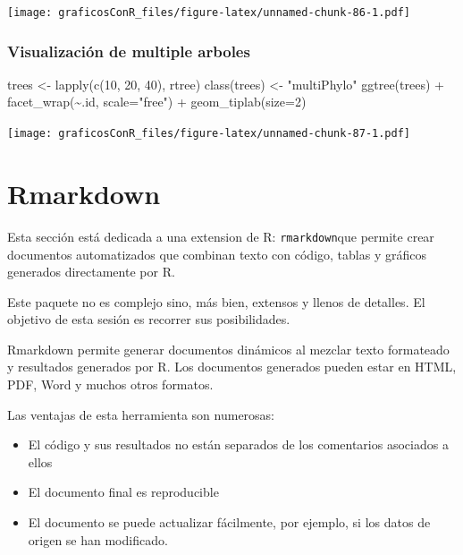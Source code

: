 \documentclass[
]{article}
\newenvironment{Shaded}{\begin{snugshade}}{\end{snugshade}}
\newcommand{\AttributeTok}[1]{\textcolor[rgb]{0.77,0.63,0.00}{#1}}
\newcommand{\DecValTok}[1]{\textcolor[rgb]{0.00,0.00,0.81}{#1}}
\newcommand{\FunctionTok}[1]{\textcolor[rgb]{0.00,0.00,0.00}{#1}}
\newcommand{\NormalTok}[1]{#1}
\newcommand{\OtherTok}[1]{\textcolor[rgb]{0.56,0.35,0.01}{#1}}
\newcommand{\SpecialCharTok}[1]{\textcolor[rgb]{0.00,0.00,0.00}{#1}}
\newcommand{\StringTok}[1]{\textcolor[rgb]{0.31,0.60,0.02}{#1}}
\providecommand{\tightlist}{%
  \setlength{\itemsep}{0pt}\setlength{\parskip}{0pt}}
\numberwithin{ejcnt}{section}
\begin{document}
\texttt{[image: graficosConR\_files/figure-latex/unnamed-chunk-86-1.pdf]}

\hypertarget{visualizaciuxf3n-de-multiple-arboles}{%
\subsubsection{Visualización de multiple arboles}\label{visualizaciuxf3n-de-multiple-arboles}}

\begin{Shaded}
\begin{Highlighting}[]
\NormalTok{trees }\OtherTok{\textless{}{-}} \FunctionTok{lapply}\NormalTok{(}\FunctionTok{c}\NormalTok{(}\DecValTok{10}\NormalTok{, }\DecValTok{20}\NormalTok{, }\DecValTok{40}\NormalTok{), rtree)}
\FunctionTok{class}\NormalTok{(trees) }\OtherTok{\textless{}{-}} \StringTok{"multiPhylo"}
\FunctionTok{ggtree}\NormalTok{(trees) }\SpecialCharTok{+} \FunctionTok{facet\_wrap}\NormalTok{(}\SpecialCharTok{\textasciitilde{}}\NormalTok{.id, }\AttributeTok{scale=}\StringTok{"free"}\NormalTok{) }\SpecialCharTok{+} \FunctionTok{geom\_tiplab}\NormalTok{(}\AttributeTok{size=}\DecValTok{2}\NormalTok{) }
\end{Highlighting}
\end{Shaded}

\texttt{[image: graficosConR\_files/figure-latex/unnamed-chunk-87-1.pdf]}

\hypertarget{rmarkdown}{%
\section{Rmarkdown}\label{rmarkdown}}

Esta sección está dedicada a una extension de R: \texttt{rmarkdown}que permite crear documentos automatizados que combinan texto con código, tablas y gráficos generados directamente por R.

Este paquete no es complejo sino, más bien, extensos y llenos de detalles. El objetivo de esta sesión es recorrer sus posibilidades.

Rmarkdown permite generar documentos dinámicos al mezclar texto formateado y resultados generados por R. Los documentos generados pueden estar en HTML, PDF, Word y muchos otros formatos.

Las ventajas de esta herramienta son numerosas:

\begin{itemize}
\tightlist
\item
  El código y sus resultados no están separados de los comentarios asociados a ellos
\item
  El documento final es reproducible
\item
  El documento se puede actualizar fácilmente, por ejemplo, si los datos de origen se han modificado.
\end{itemize}
\end{document}
